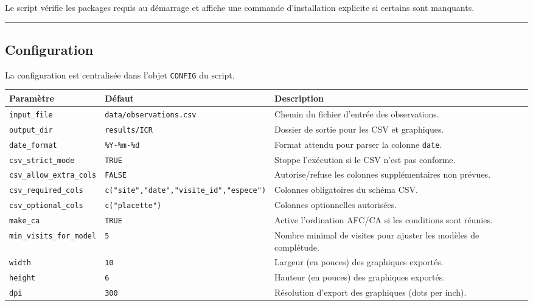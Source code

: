 Le script vérifie les packages requis au démarrage et affiche une
commande d'installation explicite si certains sont manquants.

\begin{center}\rule{0.5\linewidth}{0.5pt}\end{center}

\subsection{Configuration}\label{configuration}

La configuration est centralisée dans l'objet \texttt{CONFIG} du script.

{\def\LTcaptype{none} %
\begin{longtable}[]{@{}
  >{\raggedright\arraybackslash}p{}
  >{\raggedright\arraybackslash}p{}
  >{\raggedright\arraybackslash}p{}@{}}
\toprule\noalign{}
\begin{minipage}[b]{\linewidth}\raggedright
Paramètre
\end{minipage} & \begin{minipage}[b]{\linewidth}\raggedright
Défaut
\end{minipage} & \begin{minipage}[b]{\linewidth}\raggedright
Description
\end{minipage} \\
\midrule\noalign{}
\endhead
\bottomrule\noalign{}
\endlastfoot
\texttt{input\_file} & \texttt{data/observations.csv} & Chemin du
fichier d'entrée des observations. \\
\texttt{output\_dir} & \texttt{results/ICR} & Dossier de sortie pour les
CSV et graphiques. \\
\texttt{date\_format} & \texttt{\%Y-\%m-\%d} & Format attendu pour
parser la colonne \texttt{date}. \\
\texttt{csv\_strict\_mode} & \texttt{TRUE} & Stoppe l'exécution si le
CSV n'est pas conforme. \\
\texttt{csv\_allow\_extra\_cols} & \texttt{FALSE} & Autorise/refuse les
colonnes supplémentaires non prévues. \\
\texttt{csv\_required\_cols} &
\texttt{c("site","date","visite\_id","espece")} & Colonnes obligatoires
du schéma CSV. \\
\texttt{csv\_optional\_cols} & \texttt{c("placette")} & Colonnes
optionnelles autorisées. \\
\texttt{make\_ca} & \texttt{TRUE} & Active l'ordination AFC/CA si les
conditions sont réunies. \\
\texttt{min\_visits\_for\_model} & \texttt{5} & Nombre minimal de
visites pour ajuster les modèles de complétude. \\
\texttt{width} & \texttt{10} & Largeur (en pouces) des graphiques
exportés. \\
\texttt{height} & \texttt{6} & Hauteur (en pouces) des graphiques
exportés. \\
\texttt{dpi} & \texttt{300} & Résolution d'export des graphiques (dots
per inch). \\
\end{longtable}
}

